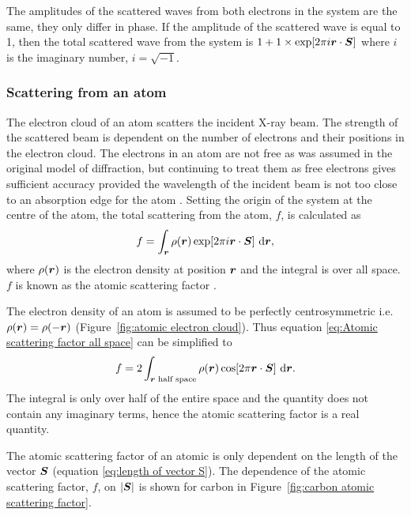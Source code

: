             The amplitudes of the scattered waves from both electrons in the system are the same, they only differ in phase.
            If the amplitude of the scattered wave is equal to 1, then the total scattered wave from the system is $1 + 1 \times \exp[2 \pi i \boldsymbol{r} \cdot \boldsymbol{S}]$ where $i$ is the imaginary number, $i = \sqrt{-1}$.

        \subsubsection{Scattering from an atom}
        \label{subs:Scattering from an atom}
            The electron cloud of an atom scatters the incident X-ray beam.
            The strength of the scattered beam is dependent on the number of electrons and their positions in the electron cloud.
            The electrons in an atom are not free as was assumed in the original model of diffraction, but continuing to treat them as free electrons gives sufficient accuracy provided the wavelength of the incident beam is not too close to an absorption edge for the atom \cite{drenth2012}.
            Setting the origin of the system at the centre of the atom, the total scattering from the atom, $f$, is calculated as
            \begin{equation}
                f = \int_{\boldsymbol{r}} \rho(\boldsymbol{r}) \exp[2 \pi i \boldsymbol{r} \cdot \boldsymbol{S}]\ \mathrm{d}\boldsymbol{r},
                \label{eq:Atomic scattering factor all space}
            \end{equation}
            where $\rho(\boldsymbol{r})$ is the electron density at position $\boldsymbol{r}$ and the integral is over all space. $f$ is known as the atomic scattering factor \cite{drenth1999}.

            The electron density of an atom is assumed to be perfectly centrosymmetric i.e. $\rho(\boldsymbol{r}) = \rho(-\boldsymbol{r})$ (Figure~\ref{fig:atomic electron cloud}).
            Thus equation \ref{eq:Atomic scattering factor all space} can be simplified to
            \begin{equation}
                f = 2 \int_{\boldsymbol{r}\text{ half space}} \rho(\boldsymbol{r}) \cos[2 \pi \boldsymbol{r} \cdot \boldsymbol{S}]\ \mathrm{d}\boldsymbol{r}.
            \end{equation}
            The integral is only over half of the entire space and the quantity does not contain any imaginary terms, hence the atomic scattering factor is a real quantity.

            The atomic scattering factor of an atomic is only dependent on the length of the vector $\boldsymbol{S}$ (equation \ref{eq:length of vector S}).
            The dependence of the atomic scattering factor, $f$, on $|\boldsymbol{S}|$ is shown for carbon in Figure~\ref{fig:carbon atomic scattering factor}.

